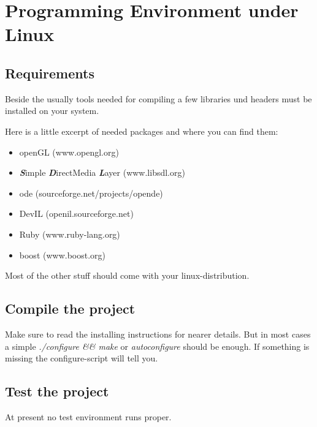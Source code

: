 
\chapter{Programming Environment under Linux}


\section{Requirements}

Beside the usually tools needed for compiling a few libraries und
headers must be installed on your system.

Here is a little excerpt of needed packages and where you can find
them:

\begin{itemize}
\item openGL (www.opengl.org)
\item \textbf{\emph{S}}imple \textbf{\emph{D}}irectMedia \textbf{\emph{L}}ayer
(www.libsdl.org)
\item ode (sourceforge.net/projects/opende)
\item DevIL (openil.sourceforge.net)
\item Ruby (www.ruby-lang.org)
\item boost (www.boost.org)
\end{itemize}
Most of the other stuff should come with your linux-distribution.


\section{Compile the project}

Make sure to read the installing instructions for nearer details.
But in most cases a simple \emph{./configure \&\& make} or \emph{autoconfigure}
should be enough. If something is missing the configure-script will
tell you.


\section{Test the project}

At present no test environment runs proper.
